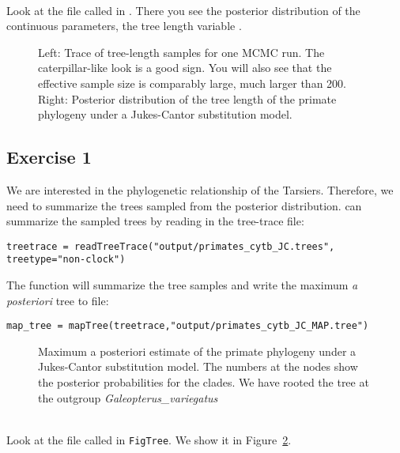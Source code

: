 \noindent \\ \impmark Look at the file called  in \Tracer. There you see the posterior distribution of the continuous parameters, \EG the tree length variable .
\begin{figure}[htbp!]
\centering
{}
\caption{\small Left: Trace of tree-length samples for one MCMC run. 
The caterpillar-like look is a good sign.
You will also see that the effective sample size is comparably large, \IE much larger than 200.
Right: Posterior distribution of the tree length of the primate phylogeny under a Jukes-Cantor substitution model.}
\label{fig:jc_tree}
\end{figure}

\subsection{Exercise 1}

We are interested in the phylogenetic relationship of the Tarsiers. Therefore, we need to summarize the trees sampled from the posterior distribution.
\RevBayes can summarize the sampled trees by reading in the tree-trace file:
{\tt \begin{snugshade*}
\begin{lstlisting}
treetrace = readTreeTrace("output/primates_cytb_JC.trees", treetype="non-clock")
\end{lstlisting}
\end{snugshade*}}
The  function will summarize the tree samples and write the maximum \textit{a posteriori} tree to file:
{\tt \begin{snugshade*}
\begin{lstlisting}
map_tree = mapTree(treetrace,"output/primates_cytb_JC_MAP.tree")
\end{lstlisting}
\end{snugshade*}}
\begin{figure}[htbp!]
\centering
{}
\caption{\small Maximum a posteriori estimate of the primate phylogeny under a Jukes-Cantor substitution model. 
The numbers at the nodes show the posterior probabilities for the clades.
We have rooted the tree at the outgroup \emph{Galeopterus\_variegatus}}
\label{fig:jc_tree}
\end{figure}
\noindent \\ \impmark Look at the file called  in \texttt{FigTree}. We show it in Figure~\ref{fig:jc_tree}.

